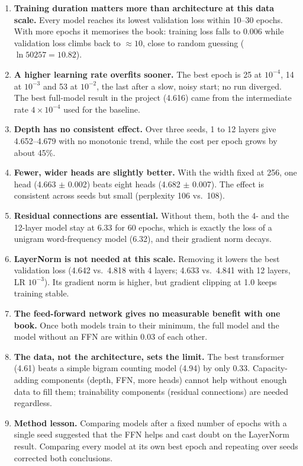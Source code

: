\documentclass[11pt,a4paper]{article}
\begin{document}
\begin{enumerate}[leftmargin=*,itemsep=5pt]
  \item \textbf{Training duration matters more than architecture at this data scale.} Every model reaches its lowest validation loss within 10--30 epochs. With more epochs it memorises the book: training loss falls to $0.006$ while validation loss climbs back to $\approx 10$, close to random guessing ($\ln 50257 = 10.82$).
  \item \textbf{A higher learning rate overfits sooner.} The best epoch is 25 at $10^{-4}$, 14 at $10^{-3}$ and 53 at $10^{-2}$, the last after a slow, noisy start; no run diverged. The best full-model result in the project (4.616) came from the intermediate rate $4\times10^{-4}$ used for the baseline.
  \item \textbf{Depth has no consistent effect.} Over three seeds, 1 to 12 layers give 4.652--4.679 with no monotonic trend, while the cost per epoch grows by about 45\%.
  \item \textbf{Fewer, wider heads are slightly better.} With the width fixed at 256, one head (4.663 $\pm$ 0.002) beats eight heads (4.682 $\pm$ 0.007). The effect is consistent across seeds but small (perplexity 106 vs.\ 108).
  \item \textbf{Residual connections are essential.} Without them, both the 4- and the 12-layer model stay at 6.33 for 60 epochs, which is exactly the loss of a unigram word-frequency model (6.32), and their gradient norm decays.
  \item \textbf{LayerNorm is not needed at this scale.} Removing it lowers the best validation loss (4.642 vs.\ 4.818 with 4 layers; 4.633 vs.\ 4.841 with 12 layers, LR $10^{-3}$). Its gradient norm is higher, but gradient clipping at 1.0 keeps training stable.
  \item \textbf{The feed-forward network gives no measurable benefit with one book.} Once both models train to their minimum, the full model and the model without an FFN are within 0.03 of each other.
  \item \textbf{The data, not the architecture, sets the limit.} The best transformer (4.61) beats a simple bigram counting model (4.94) by only 0.33. Capacity-adding components (depth, FFN, more heads) cannot help without enough data to fill them; trainability components (residual connections) are needed regardless.
  \item \textbf{Method lesson.} Comparing models after a fixed number of epochs with a single seed suggested that the FFN helps and cast doubt on the LayerNorm result. Comparing every model at its own best epoch and repeating over seeds corrected both conclusions.
\end{enumerate}
\end{document}
